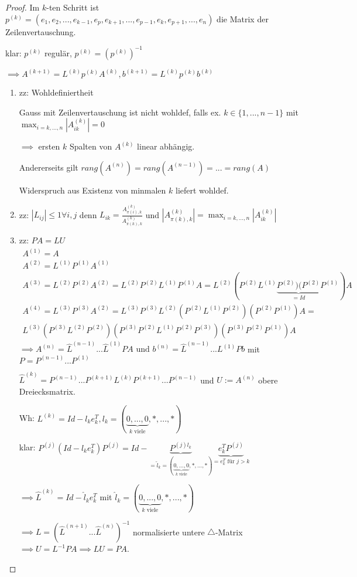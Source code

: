 \begin{proof}
	Im $k$-ten Schritt ist $p^{(k)} = (e_1, e_2, ..., e_{k-1}, e_p, e_{k+1}, ..., e_{p-1}, e_k, e_{p+1}, ..., e_n)$ die Matrix der Zeilenvertauschung.
	
	klar: $p^{(k)}$ regulär, $p^{(k)} = (p^{(k)})^{-1}$
	
	$\implies A^{(k+1)} = L^{(k)} p^{(k)} A^{(k)}, b^{(k+1)} = L^{(k)}p^{(k)}b^{(k)}$
	
	\begin{enumerate}
		\item zz: Wohldefiniertheit
		
		Gauss mit Zeilenvertauschung ist nicht wohldef, falls ex. $k \in \{1, ..., n-1\}$ mit $\max_{i=k,...,n} |A_{ik}^{(k)}| = 0$
		
		$\implies$ ersten $k$ Spalten von $A^{(k)}$ linear abhängig.
		
		Andererseits gilt $rang(A^{(n)}) = rang(A^{(n-1)}) = ... = rang(A)$
		
		Widerspruch aus Existenz von minmalen $k$ liefert wohldef.
		
		\item zz: $|L_{ij}| \leq 1 \forall i,j$ denn $L_{ik} = \frac{A_{\pi(i), k}^{(k)}}{A_{\pi(k),k}^{(k)}}$ und $|A_{\pi(k),k}^{(k)}| = \max_{i=k,...,n}|A_{ik}^{(k)}|$
		
		\item zz: $PA=LU$
		\begin{align*}
			A^{(1)} = A\\
			A^{(2)} = L^{(1)}P^{(1)}A^{(1)}\\
			A^{(3)} = L^{(2)}P^{(2)}A^{(2)} = L^{(2)}P^{(2)}L^{(1)}P^{(1)}A
			= L^{(2)} (P^{(2)} L^{(1)} \underbrace{P^{(2)})(P^{(2)}}_{=Id}P^{(1)})A\\
			A^{(4)} = L^{(3)}P^{(3)}A^{(2)} = L^{(3)}P^{(3)}L^{(2)} (P^{(2)}L^{(1)}P^{(2)})(P^{(2)}P^{(1)})A =\\
			L^{(3)}(P^{(3)}L^{(2)}P^{(2)})(P^{(3)}P^{(2)}L^{(1)}P^{(2)}P^{(3)})(P^{(3)}P^{(2)}P^{(1)})A
		\end{align*}
		$\implies A^{(n)} = \hat{L}^{(n-1)} ... \hat{L}^{(1)}PA \text{ und } b^{(n)} = \hat{L}^{(n-1)} ... L^{(1)}Pb$ mit $P=P^{(n-1)} ... P^{(1)}$
		
		$\hat{L}^{(k)} = P^{(n-1)} ... P^{(k+1)}L^{(k)}P^{(k+1)}...P^{(n-1)}$ und $U := A^{(n)}$ obere Dreiecksmatrix.
		
		Wh: $L^{(k)} = Id - l_ke_k^T, l_k=(\underbrace{0, ..., 0}_{k\text{ viele}}, *, ..., *)$
		
		klar: $P^{(j)}(Id - l_ke_k^T)P^{(j)} = Id - \underbrace{P^{(j)l_k}}_{=\tilde{l}_k = (\underbrace{0, ..., 0}_{k\text{ viele}}, *, ..., *)} \underbrace{e_k^TP^{(j)}}_{=e_k^T \text{ für } j> k}$
		
		$\implies \hat{L}^{(k)} = Id - \hat{l}_k e_k^T$ mit $\hat{l}_k = (\underbrace{0, ..., 0}_{k\text{ viele}}, *, ..., *)$
		
		$\implies L=(\hat{L}^{(n+1)} ... \hat{L}^{(n)})^{-1}$ normalisierte untere $\triangle$-Matrix $\implies U = L^{-1}PA \implies LU=PA$.
	\end{enumerate}
\end{proof}

